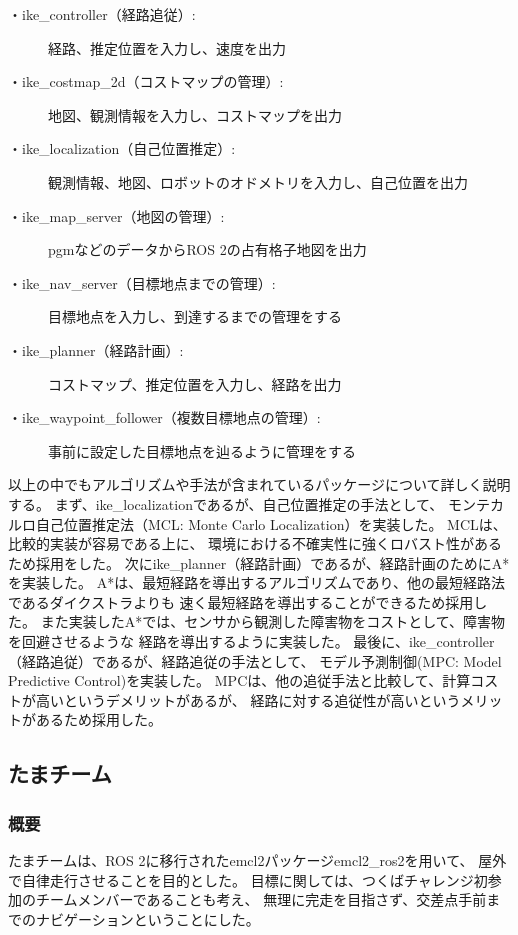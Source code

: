 \documentclass[twocolumn,9pt]{jsproceedings}
\begin{document}
\begin{description}
  \item[・ike\_controller（経路追従）:]経路、推定位置を入力し、速度を出力
  \item[・ike\_costmap\_2d（コストマップの管理）:]地図、観測情報を入力し、コストマップを出力
  \item[・ike\_localization（自己位置推定）:]観測情報、地図、ロボットのオドメトリを入力し、自己位置を出力
  \item[・ike\_map\_server（地図の管理）:]pgmなどのデータからROS 2の占有格子地図を出力
  \item[・ike\_nav\_server（目標地点までの管理）:]目標地点を入力し、到達するまでの管理をする
  \item[・ike\_planner（経路計画）:]コストマップ、推定位置を入力し、経路を出力
  \item[・ike\_waypoint\_follower（複数目標地点の管理）:]事前に設定した目標地点を辿るように管理をする
\end{description}

以上の中でもアルゴリズムや手法が含まれているパッケージについて詳しく説明する。
まず、ike\_localizationであるが、自己位置推定の手法として、
モンテカルロ自己位置推定法（MCL: Monte Carlo Localization）\cite{fox1999etal}を実装した。
MCLは、比較的実装が容易である上に、
環境における不確実性に強くロバスト性があるため採用をした。
次にike\_planner（経路計画）であるが、経路計画のためにA*\cite{hart1968}を実装した。
A*は、最短経路を導出するアルゴリズムであり、他の最短経路法であるダイクストラ\cite{dijkstra1959}よりも
速く最短経路を導出することができるため採用した。
また実装したA*では、センサから観測した障害物をコストとして、障害物を回避させるような
経路を導出するように実装した。
最後に、ike\_controller（経路追従）であるが、経路追従の手法として、
モデル予測制御(MPC: Model Predictive Control)\cite{alberto2006}を実装した。
MPCは、他の追従手法と比較して、計算コストが高いというデメリットがあるが、
経路に対する追従性が高いというメリットがあるため採用した。


\subsection{たまチーム}\label{sub:localization}
\subsubsection{概要}
たまチームは、ROS 2に移行されたemcl2パッケージemcl2\_ros2を用いて、
屋外で自律走行させることを目的とした。
目標に関しては、つくばチャレンジ初参加のチームメンバーであることも考え、
無理に完走を目指さず、交差点手前までのナビゲーションということにした。
\end{document}
